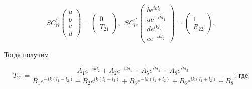 \documentclass[a4 paper, 12 pt]{extarticle}
\begin{document}
   \[
   SC_{rl}^\prime\left(
   \begin{array}{c}
   a \\
   b \\
   c \\
   d
   \end{array}\right) = \left(\begin{array}{c}
   0 \\
   T_{21}
   \end{array}\right), \ \ 
   SC_{lr}^{\prime\prime}\left(
   \begin{array}{c}
   b e^{ikl_1} \\
   a e^{-ikl_1}\\
   d e^{ikl_2}\\
   c e^{-ikl_2}
   \end{array}\right) = \left(\begin{array}{c}
   1 \\
   R_{22}
   \end{array}\right).   
   \]
   
   Тогда получим
   
   \begin{equation}
   \label{T21}
   T_{21} = 
   \frac{A_1 e^{-ikl_2} + A_2 e^{-ikl_1} + A_5 e^{ikl_1} + A_8 e^{ikl_2}}{B_1 e^{-ik\left(l_1-l_2\right)} + B_2 e^{ik\left(l_1-l_2\right)} + B_3 e^{-ik\left(l_1+l_2\right)} + B_6 e^{ik\left(l_1+l_2\right)}  + B_8}, \ \text{где}
   \end{equation}
   
\end{document}
